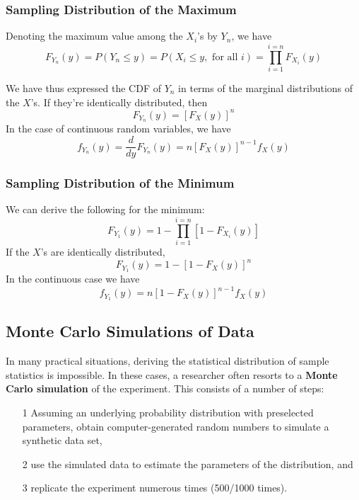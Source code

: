 \documentclass{article}
\begin{document}
\subsubsection{Sampling Distribution of the Maximum}

Denoting the maximum value among the \(X_i\)'s by \(Y_n\), we have
\begin{equation*}
    F_{Y_n}(y)=P(Y_n \leq y)=P(X_i \leq y, \text{ for all } i)=\prod_{i=1}^{i=n}F_{X_i}(y)
\end{equation*}

We have thus expressed the CDF of \(Y_n\) in terms of the marginal distributions of the \(X\)'s. If they're identically distributed, then
\begin{equation*}
    F_{Y_n}(y)=[F_X(y)]^n
\end{equation*}
In the case of continuous random variables, we have
\begin{equation*}
    f_{Y_n}(y)=\frac{d}{dy} F_{Y_n}(y)=n[F_X(y)]^{n-1}f_X(y)
\end{equation*}

\subsubsection{Sampling Distribution of the Minimum}

We can derive the following for the minimum:
\begin{equation*}
    F_{Y_1}(y)=1-\prod_{i=1}^{i=n}[1-F_{X_i}(y)]
\end{equation*}
If the $X$'s are identically distributed,
\begin{equation*}
    F_{Y_1}(y)=1-[1-F_X(y)]^n
\end{equation*}
In the continuous case we have
\begin{equation*}
    f_{Y_1}(y)=n[1-F_X(y)]^{n-1} f_X(y)
\end{equation*}

\subsection{Monte Carlo Simulations of Data}

In many practical situations, deriving the statistical distribution of sample statistics is impossible. In these cases, a researcher often resorts to a \textbf{Monte Carlo simulation} of the experiment. This consists of a number of steps:
\begin{itemize}
    \item [1] Assuming an underlying probability distribution with preselected parameters, obtain computer-generated random numbers to simulate a synthetic data set,
    \item[2] use the simulated data to estimate the parameters of the distribution, and
    \item[3] replicate the experiment numerous times (500/1000 times).
\end{itemize}
\end{document}
